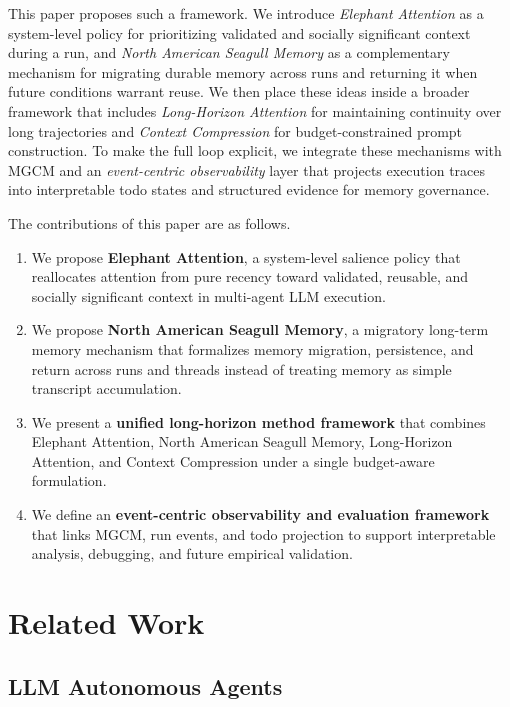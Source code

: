 \documentclass[a4paper,fleqn]{cas-sc}
\begin{document}
This paper proposes such a framework. We introduce \emph{Elephant Attention} as a system-level policy for prioritizing validated and socially significant context during a run, and \emph{North American Seagull Memory} as a complementary mechanism for migrating durable memory across runs and returning it when future conditions warrant reuse. We then place these ideas inside a broader framework that includes \emph{Long-Horizon Attention} for maintaining continuity over long trajectories and \emph{Context Compression} for budget-constrained prompt construction. To make the full loop explicit, we integrate these mechanisms with MGCM and an \emph{event-centric observability} layer that projects execution traces into interpretable todo states and structured evidence for memory governance.

The contributions of this paper are as follows.
\begin{enumerate}
\item We propose \textbf{Elephant Attention}, a system-level salience policy that reallocates attention from pure recency toward validated, reusable, and socially significant context in multi-agent LLM execution.
\item We propose \textbf{North American Seagull Memory}, a migratory long-term memory mechanism that formalizes memory migration, persistence, and return across runs and threads instead of treating memory as simple transcript accumulation.
\item We present a \textbf{unified long-horizon method framework} that combines Elephant Attention, North American Seagull Memory, Long-Horizon Attention, and Context Compression under a single budget-aware formulation.
\item We define an \textbf{event-centric observability and evaluation framework} that links MGCM, run events, and todo projection to support interpretable analysis, debugging, and future empirical validation.
\end{enumerate}

\section{Related Work}

\subsection{LLM Autonomous Agents}
\end{document}

